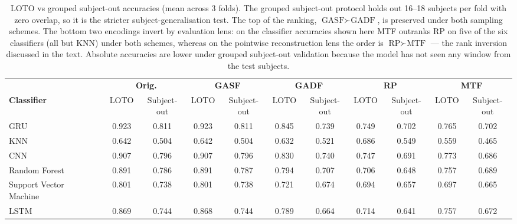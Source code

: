 \begin{table}[H]
\centering
\caption{LOTO vs grouped subject-out accuracies (mean across 3 folds). The grouped subject-out protocol holds out 16--18 subjects per fold with zero overlap, so it is the stricter subject-generalisation test. The top of the ranking, $\text{GASF}\succ\text{GADF}$, is preserved under both sampling schemes. The bottom two encodings invert by evaluation lens: on the classifier accuracies shown here MTF outranks RP on five of the six classifiers (all but KNN) under both schemes, whereas on the pointwise reconstruction lens the order is $\text{RP}\succ\text{MTF}$ --- the rank inversion discussed in the text. Absolute accuracies are lower under grouped subject-out validation because the model has not seen any window from the test subjects.}
\label{tab:loto_vs_loso}
\setlength{\tabcolsep}{3pt}
\footnotesize
\begin{tabular}{ll|cc|cc|cc|cc|cc}
\toprule
 & & \multicolumn{2}{c|}{\textbf{Orig.}} & \multicolumn{2}{c|}{\textbf{GASF}} & \multicolumn{2}{c|}{\textbf{GADF}} & \multicolumn{2}{c|}{\textbf{RP}} & \multicolumn{2}{c}{\textbf{MTF}} \\
\textbf{Classifier} & & LOTO & Subject-out & LOTO & Subject-out & LOTO & Subject-out & LOTO & Subject-out & LOTO & Subject-out \\
\midrule
GRU &  & 0.923 & 0.811 & 0.923 & 0.811 & 0.845 & 0.739 & 0.749 & 0.702 & 0.765 & 0.702 \\
KNN &  & 0.642 & 0.504 & 0.642 & 0.504 & 0.632 & 0.521 & 0.686 & 0.549 & 0.559 & 0.465 \\
CNN &  & 0.907 & 0.796 & 0.907 & 0.796 & 0.830 & 0.740 & 0.747 & 0.691 & 0.773 & 0.686 \\
Random Forest &  & 0.891 & 0.786 & 0.891 & 0.787 & 0.794 & 0.707 & 0.706 & 0.648 & 0.757 & 0.689 \\
Support Vector Machine &  & 0.801 & 0.738 & 0.801 & 0.738 & 0.721 & 0.674 & 0.694 & 0.657 & 0.697 & 0.665 \\
LSTM &  & 0.869 & 0.744 & 0.868 & 0.744 & 0.789 & 0.664 & 0.714 & 0.641 & 0.757 & 0.672 \\

\bottomrule
\end{tabular}
\end{table}
